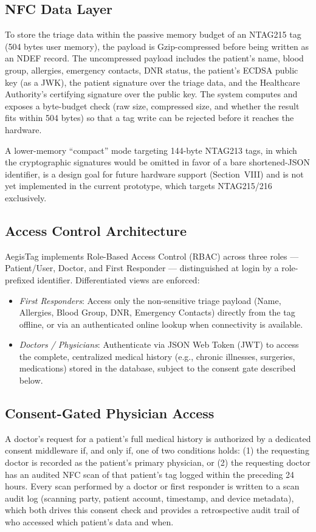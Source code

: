 \documentclass[conference]{IEEEtran}
\begin{document}
\subsection{NFC Data Layer}
To store the triage data within the passive memory budget of an NTAG215 tag (504 bytes user memory), the payload is Gzip-compressed before being written as an NDEF record. The uncompressed payload includes the patient's name, blood group, allergies, emergency contacts, DNR status, the patient's ECDSA public key (as a JWK), the patient signature over the triage data, and the Healthcare Authority's certifying signature over the public key. The system computes and exposes a byte-budget check (raw size, compressed size, and whether the result fits within 504 bytes) so that a tag write can be rejected before it reaches the hardware.

A lower-memory ``compact'' mode targeting 144-byte NTAG213 tags, in which the cryptographic signatures would be omitted in favor of a bare shortened-JSON identifier, is a design goal for future hardware support (Section~VIII) and is not yet implemented in the current prototype, which targets NTAG215/216 exclusively.

\subsection{Access Control Architecture}
AegisTag implements Role-Based Access Control (RBAC) across three roles --- Patient/User, Doctor, and First Responder --- distinguished at login by a role-prefixed identifier. Differentiated views are enforced:
\begin{itemize}
\item \textit{First Responders}: Access only the non-sensitive triage payload (Name, Allergies, Blood Group, DNR, Emergency Contacts) directly from the tag offline, or via an authenticated online lookup when connectivity is available.
\item \textit{Doctors / Physicians}: Authenticate via JSON Web Token (JWT) to access the complete, centralized medical history (e.g., chronic illnesses, surgeries, medications) stored in the database, subject to the consent gate described below.
\end{itemize}

\subsection{Consent-Gated Physician Access}
A doctor's request for a patient's full medical history is authorized by a dedicated consent middleware if, and only if, one of two conditions holds: (1) the requesting doctor is recorded as the patient's primary physician, or (2) the requesting doctor has an audited NFC scan of that patient's tag logged within the preceding 24 hours. Every scan performed by a doctor or first responder is written to a scan audit log (scanning party, patient account, timestamp, and device metadata), which both drives this consent check and provides a retrospective audit trail of who accessed which patient's data and when.
\end{document}
